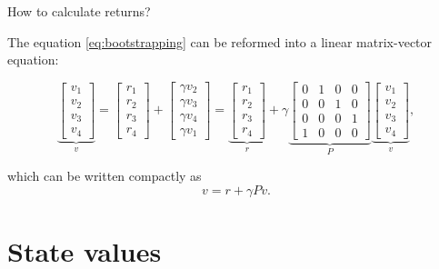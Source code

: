 \documentclass[aspectratio=169,xcolor=dvipsnames]{beamer}
\begin{document}
\begin{frame}{How to calculate returns?}

The equation \ref{eq:bootstrapping} can be reformed into a linear matrix-vector equation:

\begin{equation} \label{eq:bootstrapping_matrix}
\underbrace{
\begin{bmatrix}
v_1 \\
v_2 \\
v_3 \\
v_4
\end{bmatrix}
}_{v}
=
\begin{bmatrix}
r_1 \\
r_2 \\
r_3 \\
r_4
\end{bmatrix}
+
\begin{bmatrix}
\gamma v_2 \\
\gamma v_3 \\
\gamma v_4 \\
\gamma v_1
\end{bmatrix}
=
\underbrace{
\begin{bmatrix}
r_1 \\
r_2 \\
r_3 \\
r_4
\end{bmatrix}
}_{r}
+
\gamma
\underbrace{
\begin{bmatrix}
0 & 1 & 0 & 0 \\
0 & 0 & 1 & 0 \\
0 & 0 & 0 & 1 \\
1 & 0 & 0 & 0
\end{bmatrix}
}_{P}
\underbrace{
\begin{bmatrix}
v_1 \\
v_2 \\
v_3 \\
v_4
\end{bmatrix}
}_{v},
\end{equation}

which can be written compactly as
\begin{equation*}
	v = r + \gamma P v.
\end{equation*}

\end{frame}

\section{State values}
\end{document}
